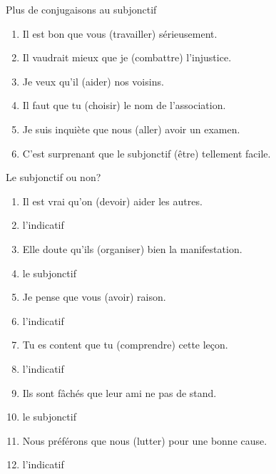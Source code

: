 \documentclass{beamer}
\begin{document}
  \begin{frame}{Plus de conjugaisons au subjonctif}
    \begin{enumerate}
      \item Il est bon que vous \underline{} (travailler) sérieusement.
      \item Il vaudrait mieux que je \underline{} (combattre) l'injustice.
      \item Je veux qu'il \underline{} (aider) nos voisins.
      \item Il faut que tu \underline{} (choisir) le nom de l'association.
      \item Je suis inquiète que nous \underline{} (aller) avoir un examen.
      \item C'est surprenant que le subjonctif \underline{} (être) tellement facile.
    \end{enumerate}
  \end{frame}

  \begin{frame}{Le subjonctif ou non?}
    \begin{enumerate}
      \item Il est vrai qu'on \underline{} (devoir) aider les autres.
      \item<3->[$\to$] l'indicatif
      \item Elle doute qu'ils \underline{} (organiser) bien la manifestation.
      \item<5->[$\to$] le subjonctif
      \item Je pense que vous \underline{} (avoir) raison.
      \item<7->[$\to$] l'indicatif
      \item Tu es content que tu \underline{} (comprendre) cette leçon.
      \item<9->[$\to$] l'indicatif
      \item Ils sont fâchés que leur ami ne \underline{} pas de stand.
      \item<11->[$\to$] le subjonctif
      \item Nous préférons que nous \underline{} (lutter) pour une bonne cause.
      \item<13->[$\to$] l'indicatif
    \end{enumerate}
  \end{frame}
\end{document}
